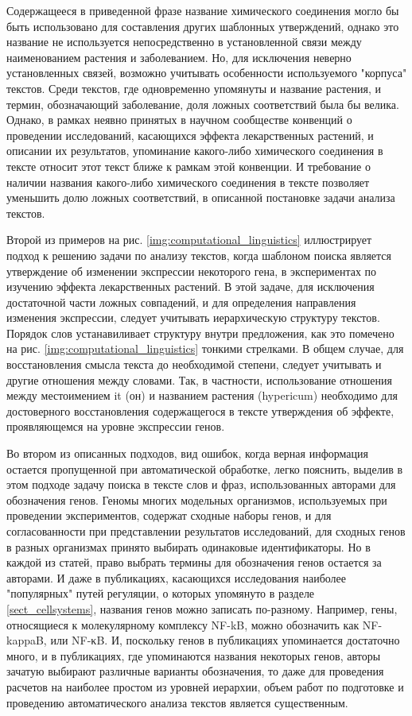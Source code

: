 Содержащееся в приведенной фразе название химического соединения могло бы быть использовано для составления других шаблонных утверждений, однако это название не используется непосредственно в установленной связи между наименованием растения и заболеванием. Но, для исключения неверно установленных связей, возможно учитывать особенности используемого "корпуса" текстов. Среди текстов, где одновременно упомянуты и название растения, и термин, обозначающий заболевание, доля ложных соответствий была бы велика. Однако, в рамках неявно принятых в научном сообществе конвенций о проведении исследований, касающихся эффекта лекарственных растений, и описании их результатов, упоминание какого-либо химического соединения в тексте относит этот текст ближе к рамкам этой конвенции. И требование о наличии названия какого-либо химического соединения в тексте позволяет уменьшить долю ложных соответствий, в описанной постановке задачи анализа текстов.

Второй из примеров на рис. \ref{img:computational_linguistics} иллюстрирует подход к решению задачи по анализу текстов, когда шаблоном поиска является утверждение об изменении экспрессии некоторого гена, в экспериментах по изучению эффекта лекарственных растений. В этой задаче, для исключения достаточной части ложных совпадений, и для определения направления изменения экспрессии, следует учитывать иерархическую структуру текстов. Порядок слов устанавиливает структуру внутри предложения, как это помечено на рис. \ref{img:computational_linguistics} тонкими стрелками. В общем случае, для восстановления смысла текста до необходимой степени, следует учитывать и другие отношения между словами. Так, в частности, использование отношения между местоимением it (он) и названием растения (hypericum) необходимо для достоверного восстановления содержащегося в тексте утверждения об эффекте, проявляющемся на уровне экспрессии генов.

Во втором из описанных подходов, вид ошибок, когда верная информация остается пропущенной при автоматической обработке, легко пояснить, выделив в этом подходе задачу поиска в тексте слов и фраз, использованных авторами для обозначения генов. Геномы многих модельных организмов, используемых при проведении экспериментов, содержат сходные наборы генов, и для согласованности при представлении результатов исследований, для сходных генов в разных организмах принято выбирать одинаковые идентификаторы. Но в каждой из статей, право выбрать термины для обозначения генов остается за авторами. И даже в публикациях, касающихся исследования наиболее "популярных" путей регуляции, о которых упомянуто в разделе \ref{sect_cellsystems}, названия генов можно записать по-разному. Например, гены, относящиеся к молекулярному комплексу NF-kB, можно обозначить как NF-kappaB, или NF-κB. И, поскольку генов в публикациях упоминается достаточно много, и в публикациях, где упоминаются названия некоторых генов, авторы зачатую выбирают различные варианты обозначения, то даже для проведения расчетов на наиболее простом из уровней иерархии, объем работ по подготовке  и проведению автоматического анализа текстов является существенным.  


